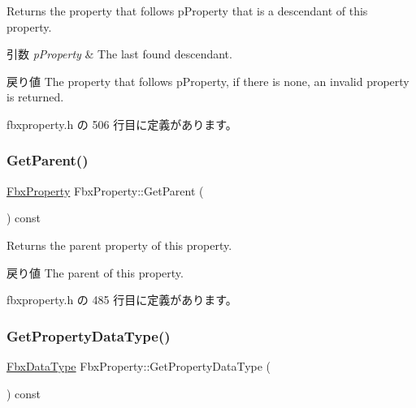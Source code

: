 Returns the property that follows p\+Property that is a descendant of this property. 
\begin{DoxyParams}{引数}
{\em p\+Property} & The last found descendant. \\
\hline
\end{DoxyParams}
\begin{DoxyReturn}{戻り値}
The property that follows p\+Property, if there is none, an invalid property is returned. 
\end{DoxyReturn}


 fbxproperty.\+h の 506 行目に定義があります。

\mbox{\label{class_fbx_property_a2cafce5b279fd3dd3a01a618538c15ca}} 
\subsubsection{\texorpdfstring{Get\+Parent()}{GetParent()}}
{\footnotesize\ttfamily \hyperlink{class_fbx_property}{Fbx\+Property} Fbx\+Property\+::\+Get\+Parent (\begin{DoxyParamCaption}{ }\end{DoxyParamCaption}) const\hspace{0.3cm}{\ttfamily [inline]}}

Returns the parent property of this property. \begin{DoxyReturn}{戻り値}
The parent of this property. 
\end{DoxyReturn}


 fbxproperty.\+h の 485 行目に定義があります。

\mbox{\label{class_fbx_property_a62565770177152f06d82c745e0811b84}} 
\subsubsection{\texorpdfstring{Get\+Property\+Data\+Type()}{GetPropertyDataType()}}
{\footnotesize\ttfamily \hyperlink{class_fbx_data_type}{Fbx\+Data\+Type} Fbx\+Property\+::\+Get\+Property\+Data\+Type (\begin{DoxyParamCaption}{ }\end{DoxyParamCaption}) const}

